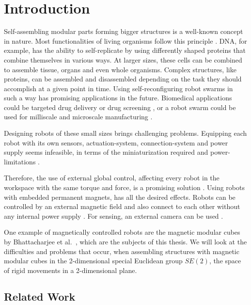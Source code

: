 \chapter{Introduction}
\label{chap:intro}

Self-assembling modular parts forming bigger structures is a well-known concept in nature.
Most functionalities of living organisms follow this principle \cite{bishop2005}.
DNA, for example, has the ability to self-replicate by using differently shaped proteins that combine themselves in various ways.
At larger sizes, these cells can be combined to assemble tissue, organs and even whole organisms.
Complex structures, like proteins, can be assembled and disassembled depending on the task they should accomplish at a given point in time. 
Using self-reconfiguring robot swarms in such a way has promising applications in the future.
Biomedical applications could be targeted drug delivery or drug screening \cite{sitti2015}, or a robot swarm could be used for milliscale and microscale manufacturing \cite{pelrine2016}.

Designing robots of these small sizes brings challenging problems.
Equipping each robot with its own sensors, actuation-system, connection-system and power supply seems infeasible, in terms of the miniaturization required and power-limitations \cite{white2007}.

Therefore, the use of external global control, affecting every robot in the workspace with the same torque and force, is a promising solution \cite{white2007}.
Using robots with embedded permanent magnets, has all the desired effects.
Robots can be controlled by an external magnetic field and also connect to each other without any internal power supply \cite{saab2019}.
For sensing, an external camera can be used \cite{Lu2023}.

One example of magnetically controlled robots are the magnetic modular cubes by Bhattacharjee et al.\ \cite{Bhattacharjee2022}, which are the subjects of this thesis.
We will look at the difficulties and problems that occur, when assembling structures with magnetic modular cubes in the 2-dimensional special Euclidean group $\textit{SE}(2)$, the space of rigid movements in a 2-dimensional plane.



\section{Related Work}

